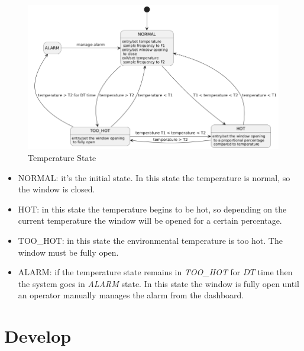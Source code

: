 \documentclass[a4paper,12pt]{report}
\begin{document}
            \begin{figure}[H]
                \centering{}
                \includegraphics[width=\textwidth]{uml/img/TemperatureStateUML.png}
                \caption{Temperature State}
                \label{img:temperature_state}
            \end{figure}

            \begin{itemize}
                \item NORMAL: it's the initial state. In this state the temperature is normal, so the window is closed.
                \item HOT: in this state the temperature begins to be hot, so depending on the current temperature the window will be 
                opened for a certain percentage.
                \item TOO\_HOT: in this state the environmental temperature is too hot. The window must be fully open.
                \item ALARM: if the temperature state remains in \textit{TOO\_HOT} for $DT$ time then the system goes in \textit{ALARM} 
                state. In this state the window is fully open until an operator manually manages the alarm from the dashboard.
            \end{itemize}

\chapter{Develop}
\end{document}
